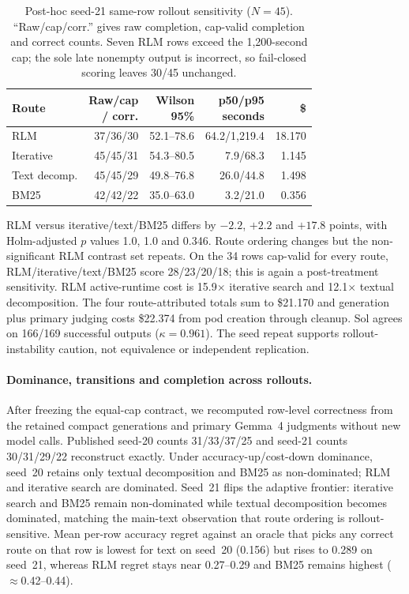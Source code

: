 \begin{table}[!htbp]
\centering
\small
\setlength{\tabcolsep}{1pt}
\begin{tabular}{@{}lrrrr@{}}
\toprule
\textbf{Route} & \shortstack{\textbf{Raw/cap}\\\textbf{/ corr.}} &
\shortstack{\textbf{Wilson}\\\textbf{95\%}} &
\shortstack{\textbf{p50/p95}\\\textbf{seconds}} & \textbf{\$} \\
\midrule
RLM & 37/36/30 & 52.1--78.6 & 64.2/1,219.4 & 18.170 \\
Iterative & 45/45/31 & 54.3--80.5 & 7.9/68.3 & 1.145 \\
Text decomp. & 45/45/29 & 49.8--76.8 & 26.0/44.8 & 1.498 \\
BM25 & 42/42/22 & 35.0--63.0 & 3.2/21.0 & 0.356 \\
\bottomrule
\end{tabular}
\caption{Post-hoc seed-21 same-row rollout sensitivity ($N=45$).
``Raw/cap/corr.'' gives raw completion, cap-valid completion and correct
counts. Seven RLM rows exceed the 1,200-second cap; the sole late nonempty
output is incorrect, so fail-closed scoring leaves 30/45 unchanged.}
\label{tab:supp-browsecomp-equal-cap-seed21}
\end{table}

RLM versus iterative/text/BM25 differs by $-2.2$, $+2.2$ and $+17.8$
points, with Holm-adjusted $p$ values 1.0, 1.0 and 0.346. Route ordering
changes but the non-significant RLM contrast set repeats. On the 34 rows
cap-valid for every route, RLM/iterative/text/BM25 score 28/23/20/18; this is
again a post-treatment sensitivity. RLM active-runtime cost is
15.9$\times$ iterative search and 12.1$\times$ textual decomposition. The
four route-attributed totals sum to \$21.170 and generation plus primary
judging costs \$22.374 from pod creation through cleanup. Sol agrees on
166/169 successful outputs ($\kappa{=}0.961$). The seed repeat supports
rollout-instability caution, not equivalence or independent replication.

\paragraph{Dominance, transitions and completion across rollouts.}
After freezing the equal-cap contract, we recomputed row-level correctness from
the retained compact generations and primary Gemma~4 judgments without new model
calls. Published seed-20 counts 31/33/37/25 and seed-21 counts 30/31/29/22
reconstruct exactly. Under accuracy-up/cost-down dominance, seed~20 retains only
textual decomposition and BM25 as non-dominated; RLM and iterative search are
dominated. Seed~21 flips the adaptive frontier: iterative search and BM25 remain
non-dominated while textual decomposition becomes dominated, matching the main-text
observation that route ordering is rollout-sensitive. Mean per-row accuracy regret
against an oracle that picks any correct route on that row is lowest for text on
seed~20 (0.156) but rises to 0.289 on seed~21, whereas RLM regret stays near
0.27--0.29 and BM25 remains highest ($\approx$0.42--0.44).

